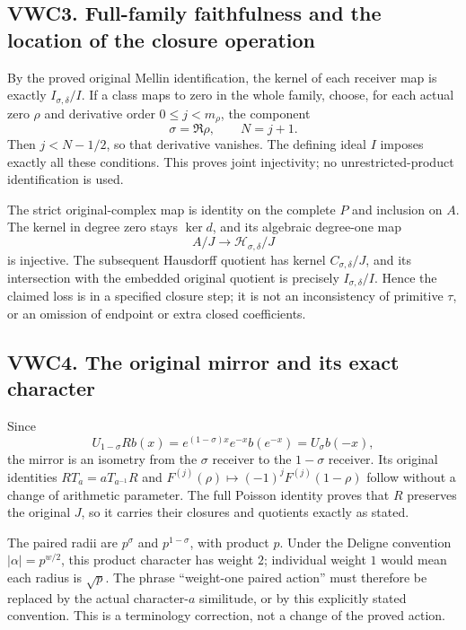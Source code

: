 \subsection{VWC3. Full-family faithfulness and the location of the
closure
operation}\label{vwc3.-full-family-faithfulness-and-the-location-of-the-closure-operation}

By the proved original Mellin identification, the kernel of each
receiver map is exactly \(I_{\sigma,\delta}/I\). If a class maps to zero
in the whole family, choose, for each actual zero \(\rho\) and
derivative order \(0\leq j<m_\rho\), the component \[
\sigma=\Re\rho,\qquad N=j+1.
\] Then \(j<N-1/2\), so that derivative vanishes. The defining ideal
\(I\) imposes exactly all these conditions. This proves joint
injectivity; no unrestricted-product identification is used.

The strict original-complex map is identity on the complete \(P\) and
inclusion on \(A\). The kernel in degree zero stays \(\ker d\), and its
algebraic degree-one map \[
A/J\longrightarrow\mathcal H_{\sigma,\delta}/J
\] is injective. The subsequent Hausdorff quotient has kernel
\(C_{\sigma,\delta}/J\), and its intersection with the embedded original
quotient is precisely \(I_{\sigma,\delta}/I\). Hence the claimed loss is
in a specified closure step; it is not an inconsistency of primitive
\(\tau\), or an omission of endpoint or extra closed coefficients.

\subsection{VWC4. The original mirror and its exact
character}\label{vwc4.-the-original-mirror-and-its-exact-character}

Since \[
U_{1-\sigma}Rb(x)
=e^{(1-\sigma)x}e^{-x}b(e^{-x})
=U_\sigma b(-x),
\] the mirror is an isometry from the \(\sigma\) receiver to the
\(1-\sigma\) receiver. Its original identities \(RT_a=aT_{a^{-1}}R\) and
\(F^{(j)}(\rho)\mapsto(-1)^jF^{(j)}(1-\rho)\) follow without a change of
arithmetic parameter. The full Poisson identity proves that \(R\)
preserves the original \(J\), so it carries their closures and quotients
exactly as stated.

The paired radii are \(p^\sigma\) and \(p^{1-\sigma}\), with product
\(p\). Under the Deligne convention \(|\alpha|=p^{w/2}\), this product
character has weight \(2\); individual weight \(1\) would mean each
radius is \(\sqrt p\). The phrase ``weight-one paired action'' must
therefore be replaced by the actual character-\(a\) similitude, or by
this explicitly stated convention. This is a terminology correction, not
a change of the proved action.

